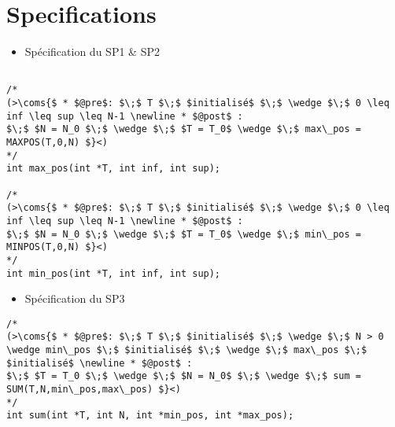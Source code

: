 \section{Specifications}\label{specifications}
\begin{itemize}
\item[\textbullet] Spécification du SP1 \& SP2
\end{itemize}
\begin{lstlisting}

/*
(>\coms{$ * $@pre$: $\;$ T $\;$ $initialisé$ $\;$ \wedge $\;$ 0 \leq inf \leq sup \leq N-1 \newline * $@post$ : 
$\;$ $N = N_0 $\;$ \wedge $\;$ $T = T_0$ \wedge $\;$ max\_pos = MAXPOS(T,0,N) $}<)
*/
int max_pos(int *T, int inf, int sup);

/*
(>\coms{$ * $@pre$: $\;$ T $\;$ $initialisé$ $\;$ \wedge $\;$ 0 \leq inf \leq sup \leq N-1 \newline * $@post$ : 
$\;$ $N = N_0 $\;$ \wedge $\;$ $T = T_0$ \wedge $\;$ min\_pos = MINPOS(T,0,N) $}<)
*/
int min_pos(int *T, int inf, int sup);
\end{lstlisting}
\begin{itemize}
\item[\textbullet] Spécification du SP3
\end{itemize}
\begin{lstlisting}
/*
(>\coms{$ * $@pre$: $\;$ T $\;$ $initialisé$ $\;$ \wedge $\;$ N > 0 \wedge min\_pos $\;$ $initialisé$ $\;$ \wedge $\;$ max\_pos $\;$ $initialisé$ \newline * $@post$ : 
$\;$ $T = T_0 $\;$ \wedge $\;$ $N = N_0$ $\;$ \wedge $\;$ sum = SUM(T,N,min\_pos,max\_pos) $}<)
*/
int sum(int *T, int N, int *min_pos, int *max_pos);


\end{lstlisting}




\newline\newline


